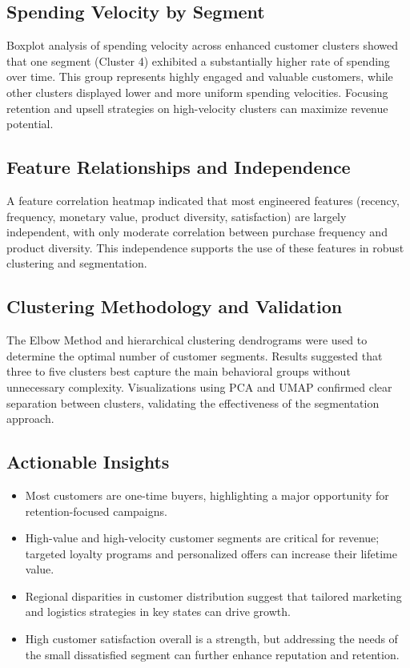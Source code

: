 \documentclass[a4paper]{article}
\begin{document}
\begin{multicols}{2}
\subsection{Spending Velocity by Segment}
Boxplot analysis of spending velocity across enhanced customer clusters showed that one segment (Cluster 4) exhibited a substantially higher rate of spending over time. This group represents highly engaged and valuable customers, while other clusters displayed lower and more uniform spending velocities. Focusing retention and upsell strategies on high-velocity clusters can maximize revenue potential.

\subsection{Feature Relationships and Independence}
A feature correlation heatmap indicated that most engineered features (recency, frequency, monetary value, product diversity, satisfaction) are largely independent, with only moderate correlation between purchase frequency and product diversity. This independence supports the use of these features in robust clustering and segmentation.

\subsection{Clustering Methodology and Validation}
The Elbow Method and hierarchical clustering dendrograms were used to determine the optimal number of customer segments. Results suggested that three to five clusters best capture the main behavioral groups without unnecessary complexity. Visualizations using PCA and UMAP confirmed clear separation between clusters, validating the effectiveness of the segmentation approach.

\subsection{Actionable Insights}
\begin{itemize}
    \item Most customers are one-time buyers, highlighting a major opportunity for retention-focused campaigns.
    \item High-value and high-velocity customer segments are critical for revenue; targeted loyalty programs and personalized offers can increase their lifetime value.
    \item Regional disparities in customer distribution suggest that tailored marketing and logistics strategies in key states can drive growth.
    \item High customer satisfaction overall is a strength, but addressing the needs of the small dissatisfied segment can further enhance reputation and retention.
\end{itemize}


\end{multicols}
\end{document}
